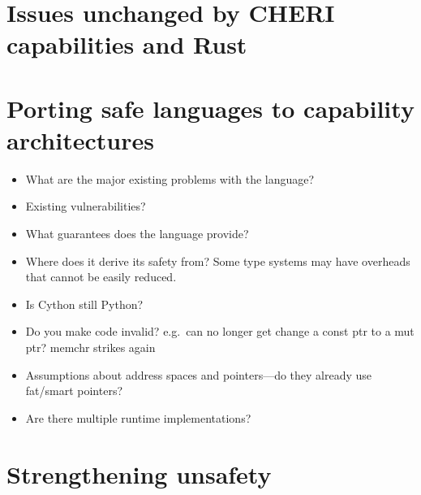 \documentclass[dissertation.tex]{subfiles}
\begin{document}
\section{Issues unchanged by CHERI capabilities and Rust}


\section{Porting safe languages to capability architectures}
\label{sec:eval-othersafe}

\begin{itemize}
    \item What are the major existing problems with the language?
    \item Existing vulnerabilities?
    \item What guarantees does the language provide?
    \item Where does it derive its safety from? Some type systems may
    have overheads that cannot be easily reduced.
    \item Is Cython still Python?
    \item Do you make code invalid? e.g.\ can no longer get change a
    const ptr to a mut ptr? memchr strikes again
    \item Assumptions about address spaces and pointers---do they
    already use fat/smart pointers?
    \item Are there multiple runtime implementations?
\end{itemize}


\section{Strengthening unsafety}
\label{sec:eval-betterunsafe}
\end{document}
